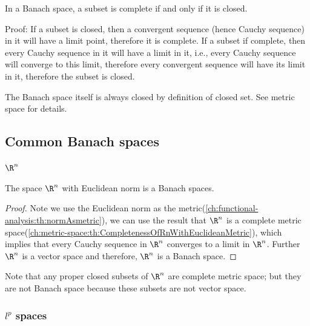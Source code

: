 \begin{refsection}
\begin{lemma}
	In a Banach space, a subset is complete if and only if it is closed.
\end{lemma}

Proof: If a subset is closed, then a convergent sequence (hence Cauchy sequence) in it will have a limit point, therefore it is complete. If a subset if complete, then every Cauchy sequence in it will have a limit in it, i.e., every Cauchy sequence will converge to this limit, therefore every convergent sequence will have its limit in it, therefore the subset is closed.

\begin{remark}
	The Banach space itself is always closed by definition of closed set. See metric space for details.
\end{remark}


\subsection{Common Banach spaces}
\subsubsection{$\R^n$}

\begin{theorem}\label{ch:functional-analysis:th:RnisBanachSpace}\cite[48]{christensen2010functions}
	 The space $\R^n$ with Euclidean norm is a Banach spaces. 
\end{theorem}
\begin{proof}
Note we use the Euclidean norm as the metric(\autoref{ch:functional-analysis:th:normAsmetric}), we can use the result that $\R^n$ is a complete metric space(\autoref{ch:metric-space:th:CompletenessOfRnWithEuclideanMetric}), which implies that every Cauchy sequence in $\R^n$ converges to a limit in $\R^n$. Further $\R^n$ is a vector space and therefore, $\R^n$ is a Banach space.
\end{proof}

\begin{remark}
Note that any proper closed subsets of $\R^n$ are complete metric space; but they are not Banach space because these subsets are not vector space.	
\end{remark}


\subsubsection{$l^p$ spaces}


\end{refsection}

